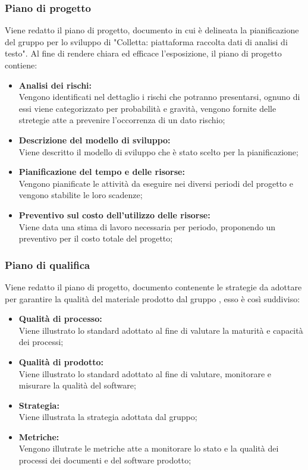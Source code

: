 \subsubsection{Piano di progetto}
Viene redatto il piano di progetto, documento in cui è delineata la pianificazione del gruppo \gruppo \space per lo sviluppo
di "Colletta: piattaforma raccolta dati di analisi di testo". \newline
Al fine di rendere chiara ed efficace l'esposizione, il piano di progetto contiene:
\begin{itemize}
	\item \textbf{Analisi dei rischi:}\\
Vengono identificati nel dettaglio i rischi che potranno presentarsi, ognuno di essi viene categorizzato per probabilità e gravità, vengono fornite delle stretegie atte a prevenire l’occorrenza di un dato rischio;
\item \textbf{Descrizione del modello di sviluppo:}\\
Viene descritto il modello di sviluppo che è stato scelto per la pianificazione;
\item \textbf{Pianificazione del tempo e delle risorse:}\\
Vengono pianificate le attività da eseguire nei diversi periodi del progetto e vengono stabilite le loro scadenze;
\item \textbf{Preventivo sul costo dell'utilizzo delle risorse:}\\
Viene data una stima di lavoro necessaria per periodo,
proponendo un preventivo per il costo totale del progetto;
\end{itemize}

\subsubsection{Piano di qualifica}
Viene redatto il piano di progetto, documento contenente le strategie
da adottare per garantire la qualità del materiale prodotto dal gruppo \gruppo, esso è così suddiviso:\\

\begin{itemize}
	\item \textbf{Qualità di processo:}\\
	Viene illustrato lo standard adottato al fine di valutare la maturità e capacità dei processi;
	\item \textbf{Qualità di prodotto:}\\
	Viene illustrato lo standard adottato al fine di valutare, monitorare e misurare la qualità del software;
	\item \textbf{Strategia:}\\
	Viene illustrata la strategia adottata dal gruppo;
	\item \textbf{Metriche:}\\
	Vengono illutrate le metriche atte a monitorare lo stato e la qualità dei processi dei documenti e del software prodotto;
\end{itemize}

